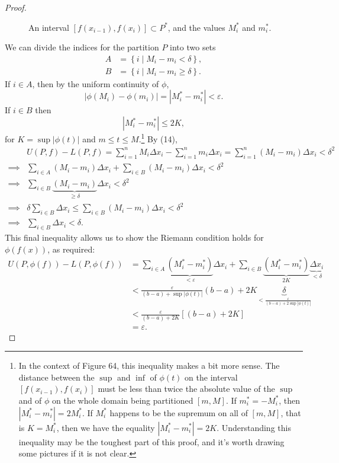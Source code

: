 \documentclass{article}
\theoremstyle{definition}
\begin{document}
\begin{proof}
\begin{figure}[h!]
	\caption{An interval $ [f(x_{i-1}),f(x_{i})]\subset P^* $, and the values $ M_i^* $  and $ m_i^* $.}
\end{figure}
 We can divide the indices for the partition $ P $ into two sets \begin{align*}
A&=\left\{i\mid M_i-m_i<\delta \right\},\\
B&=\left\{i\mid M_i-m_i\ge\delta \right\}.
\end{align*} 
If $ i\in A $, then by the uniform continuity of $ \phi $, $$|\phi(M_i)-\phi(m_i)|=|M_i^*-m_i^*|<\varepsilon .$$ If $ i\in B $ then $$|M_i^*-m_i^*|\le 2K ,$$ for $ K=\sup|\phi(t)| $ and $ m\le t\le M $.\footnote{In the context of Figure 64, this inequality makes a bit more sense. The distance between the $ \sup $ and $ \inf $ of $ \phi(t) $ on the interval $ [f(x_{i-1}),f(x_{i})] $ must be less than twice the absolute value of the $ \sup $ and of $ \phi $ on the whole domain being partitioned $ [m,M] $. If $ m_i^*=-M_i^* $, then $ |M_i^*-m_i^*|=2M_i^* $. If $ M_i^* $ happens to be the supremum on all of $ [m,M] $, that is $ K=M_i^* $, then we have the equality $ |M_i^*-m_i^*|=2K $. Understanding this inequality may be the toughest part of this proof, and it's worth drawing some pictures if it is not clear.} 	By (14), \begin{align*}
	&U(P,f)-L(P,f)=\sum_{i=1}^nM_i\Delta x_i-\sum_{i=1}^nm_i\Delta x_i=\sum_{i=1}^n(M_i-m_i)\Delta x_i<\delta^2\\\implies&\sum_{i\in A}(M_i-m_i)\Delta x_i+\sum_{i\in B}(M_i-m_i)\Delta x_i<\delta^2\\\implies&\sum_{i\in B}\underbrace{(M_i-m_i)}_{\ge\delta}\Delta x_i<\delta^2\\\implies& \delta \sum_{i\in B}\Delta x_i\le\sum_{i\in B}(M_i-m_i)\Delta x_i<\delta^2\\\implies& \sum_{i\in B}\Delta x_i<\delta.
\end{align*}
This final inequality allows us to show the Riemann condition holds for $ \phi(f(x)) $, as required:
\begin{align*}
	U(P,\phi(f))-L(P,\phi(f))&=\sum_{i\in A}\underbrace{(M_i^*-m_i^*)}_{<\varepsilon}\Delta x_i+\sum_{i\in B}\underbrace{(M_i^*-m_i^*)}_{2K}\underbrace{\Delta x_i}_{<\delta}\\&<\frac{\varepsilon}{(b-a)+\sup|\phi(t)|}(b-a)+2K\underbrace{\delta}_{<\frac{\varepsilon}{(b-a)+2\sup|\phi(t)|}}\\&<\frac{\varepsilon}{(b-a)+2K}[(b-a)+2K]\\&=\varepsilon.
\end{align*}
\end{proof}
\end{document}
